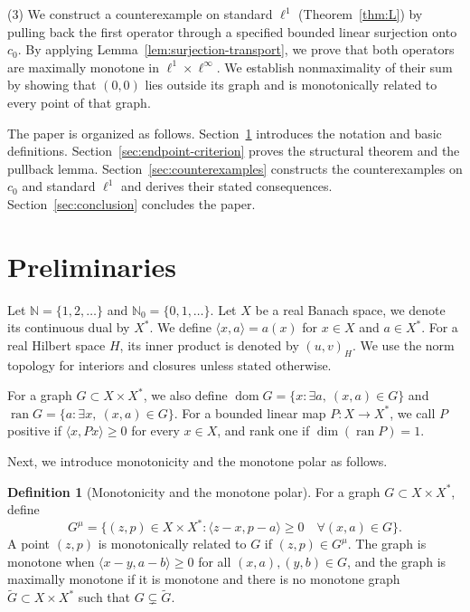 \documentclass[11pt]{article}
\newcommand{\N}{\mathbb N}
\newcommand{\dom}{\operatorname{dom}}
\newcommand{\pair}[2]{\langle #1,#2\rangle}
\theoremstyle{definition}
\newtheorem{definition}{Definition}
\theoremstyle{remark}
\begin{document}
(3) We construct a counterexample on standard $\ell^1$ (Theorem~\ref{thm:L}) by pulling back the first operator through a specified bounded linear surjection onto $c_0$. By applying Lemma~\ref{lem:surjection-transport}, we prove that both operators are maximally monotone in $\ell^1\times\ell^\infty$. We establish nonmaximality of their sum by showing that $(0,0)$ lies outside its graph and is monotonically related to every point of that graph. 

The paper is organized as follows. Section~\ref{sec:definitions} introduces the notation and basic definitions. Section~\ref{sec:endpoint-criterion} proves the structural theorem and the pullback lemma. Section~\ref{sec:counterexamples} constructs the counterexamples on $c_0$ and standard $\ell^1$ and derives their stated consequences. Section~\ref{sec:conclusion} concludes the paper.


\section{Preliminaries}
\label{sec:definitions}
Let $\N=\{1,2,\ldots\}$ and $\N_0=\{0,1,\ldots\}$. Let $X$ be a real Banach space, we denote its continuous dual by $X^*$. We define $\pair{x}{a}=a(x)$ for $x\in X$ and $a\in X^*$. For a real Hilbert space $H$, its inner product is denoted by $(u,v)_H$. We use the norm topology for interiors and closures unless stated otherwise. 

For a graph $G\subset X\times X^*$, we also define $\dom G=\{x:\exists a,\ (x,a)\in G\}$ and $\operatorname{ran}G=\{a:\exists x,\ (x,a)\in G\}$. 
For a bounded linear map $P:X\to X^*$, we call $P$ positive if $\pair{x}{Px}\ge0$ for every $x\in X$, and rank one if $\dim(\operatorname{ran}P)=1$. 

Next, we introduce monotonicity and the monotone polar  \cite{martinezsvaiter2005,bauschkemclarensendov2006} as follows. 

\begin{definition}[Monotonicity and the monotone polar]
\label{D1}
For a graph $G\subset X\times X^*$, define
\begin{equation}
G^\mu=\{(z,p)\in X\times X^*:
 \pair{z-x}{p-a}\ge0\quad\forall(x,a)\in G\}.
\label{eq:D1}
\end{equation}
A point $(z,p)$ is monotonically related to $G$ if $(z,p)\in G^\mu$.
The graph is monotone when $\pair{x-y}{a-b}\ge0$ for all $(x,a),(y,b)\in G$, and the graph is maximally monotone if it is monotone and there is no monotone graph $\widetilde G\subset X\times X^*$ such that $G\subsetneq\widetilde G$. 
\end{definition}
\end{document}

